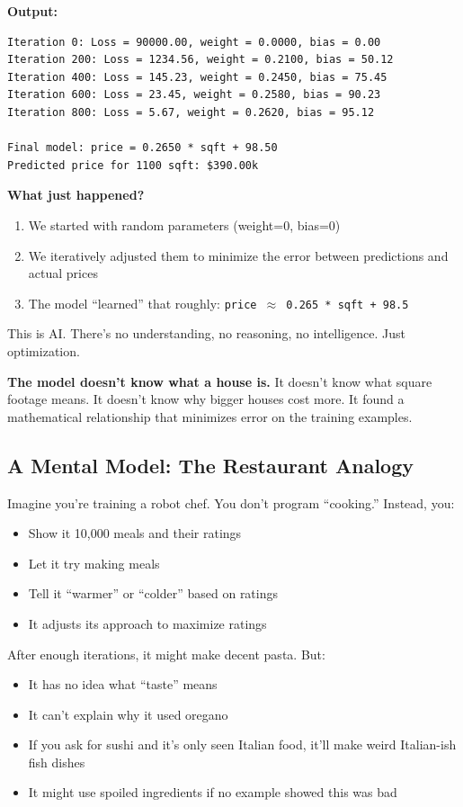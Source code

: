 \documentclass[11pt,oneside]{book}
\begin{document}
\textbf{Output:}
\begin{verbatim}
Iteration 0: Loss = 90000.00, weight = 0.0000, bias = 0.00
Iteration 200: Loss = 1234.56, weight = 0.2100, bias = 50.12
Iteration 400: Loss = 145.23, weight = 0.2450, bias = 75.45
Iteration 600: Loss = 23.45, weight = 0.2580, bias = 90.23
Iteration 800: Loss = 5.67, weight = 0.2620, bias = 95.12

Final model: price = 0.2650 * sqft + 98.50
Predicted price for 1100 sqft: $390.00k
\end{verbatim}

\textbf{What just happened?}
\begin{enumerate}
\item We started with random parameters (weight=0, bias=0)
\item We iteratively adjusted them to minimize the error between predictions and actual prices
\item The model ``learned'' that roughly: \texttt{price \(\approx\) 0.265 * sqft + 98.5}
\end{enumerate}

This is AI. There's no understanding, no reasoning, no intelligence. Just optimization.

\textbf{The model doesn't know what a house is.} It doesn't know what square footage means. It doesn't know why bigger houses cost more. It found a mathematical relationship that minimizes error on the training examples.

\subsection{A Mental Model: The Restaurant Analogy}

Imagine you're training a robot chef. You don't program ``cooking.'' Instead, you:
\begin{itemize}
\item Show it 10,000 meals and their ratings
\item Let it try making meals
\item Tell it ``warmer'' or ``colder'' based on ratings
\item It adjusts its approach to maximize ratings
\end{itemize}

After enough iterations, it might make decent pasta. But:
\begin{itemize}
\item It has no idea what ``taste'' means
\item It can't explain why it used oregano
\item If you ask for sushi and it's only seen Italian food, it'll make weird Italian-ish fish dishes
\item It might use spoiled ingredients if no example showed this was bad
\end{itemize}
\end{document}
